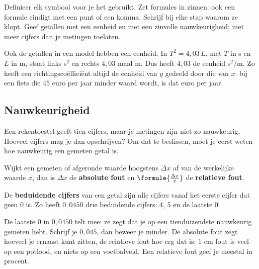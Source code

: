 \begin{werkwijze}
Definieer elk symbool voor je het gebruikt. Zet formules in zinnen: ook een formule eindigt met een punt of een komma. Schrijf bij elke stap waarom ze klopt. Geef getallen met een eenheid en met een zinvolle nauwkeurigheid: niet meer cijfers dan je metingen toelaten.
\end{werkwijze}

Ook de getallen in een model hebben een eenheid. In $T^2 = 4{,}03\,L$, met $T$ in s en $L$ in m, staat links s$^2$ en rechts $4{,}03$ maal m. Dus heeft $4{,}03$ de eenheid s$^2$/m. Zo heeft een richtingscoëfficiënt altijd de eenheid van $y$ gedeeld door die van $x$: bij een fiets die $45$ euro per jaar minder waard wordt, is dat euro per jaar.

\begin{oefeningen}
\end{oefeningen}

\subsection{Nauwkeurigheid}

Een rekentoestel geeft tien cijfers, maar je metingen zijn niet zo nauwkeurig. Hoeveel cijfers mag je dan opschrijven? Om dat te beslissen, moet je eerst weten hoe nauwkeurig een gemeten getal is.

\begin{theorie}
Wijkt een gemeten of afgeronde waarde hoogstens $\Delta x$ af van de werkelijke waarde $x$, dan is $\Delta x$ de \textbf{\textcolor{accent}{absolute fout}} en $\formule{\frac{\Delta x}{x}}$ de \textbf{\textcolor{accent}{relatieve fout}}.

\vspace{1mm}
De \textbf{\textcolor{accent}{beduidende cijfers}} van een getal zijn alle cijfers vanaf het eerste cijfer dat geen $0$ is. Zo heeft $0{,}0450$ drie beduidende cijfers: $4$, $5$ en de laatste $0$.
\end{theorie}

De laatste $0$ in $0{,}0450$ telt mee: ze zegt dat je op een tienduizendste nauwkeurig gemeten hebt. Schrijf je $0{,}045$, dan beweer je minder. De absolute fout zegt hoeveel je ernaast kunt zitten, de relatieve fout hoe erg dat is: $1$ cm fout is veel op een potlood, en niets op een voetbalveld. Een relatieve fout geef je meestal in procent.


